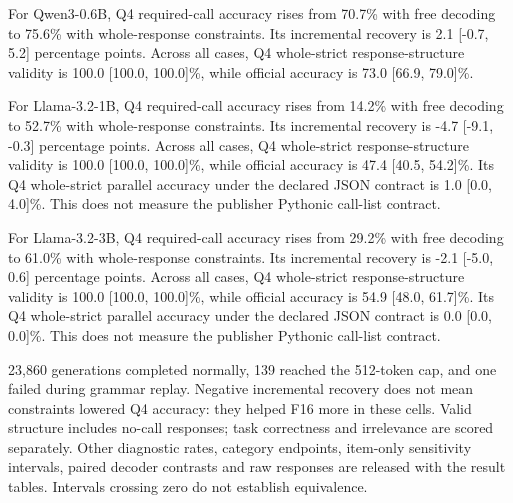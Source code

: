 For Qwen3-0.6B, Q4 required-call accuracy rises from 70.7\% with free decoding to 75.6\% with whole-response constraints. Its incremental recovery is 2.1 [-0.7, 5.2] percentage points. Across all cases, Q4 whole-strict response-structure validity is 100.0 [100.0, 100.0]\%, while official accuracy is 73.0 [66.9, 79.0]\%.

For Llama-3.2-1B, Q4 required-call accuracy rises from 14.2\% with free decoding to 52.7\% with whole-response constraints. Its incremental recovery is -4.7 [-9.1, -0.3] percentage points. Across all cases, Q4 whole-strict response-structure validity is 100.0 [100.0, 100.0]\%, while official accuracy is 47.4 [40.5, 54.2]\%. Its Q4 whole-strict parallel accuracy under the declared JSON contract is 1.0 [0.0, 4.0]\%. This does not measure the publisher Pythonic call-list contract.

For Llama-3.2-3B, Q4 required-call accuracy rises from 29.2\% with free decoding to 61.0\% with whole-response constraints. Its incremental recovery is -2.1 [-5.0, 0.6] percentage points. Across all cases, Q4 whole-strict response-structure validity is 100.0 [100.0, 100.0]\%, while official accuracy is 54.9 [48.0, 61.7]\%. Its Q4 whole-strict parallel accuracy under the declared JSON contract is 0.0 [0.0, 0.0]\%. This does not measure the publisher Pythonic call-list contract.

23,860 generations completed normally, 139 reached the 512-token cap, and one failed during grammar replay. Negative incremental recovery does not mean constraints lowered Q4 accuracy: they helped F16 more in these cells. Valid structure includes no-call responses; task correctness and irrelevance are scored separately. Other diagnostic rates, category endpoints, item-only sensitivity intervals, paired decoder contrasts and raw responses are released with the result tables. Intervals crossing zero do not establish equivalence.
